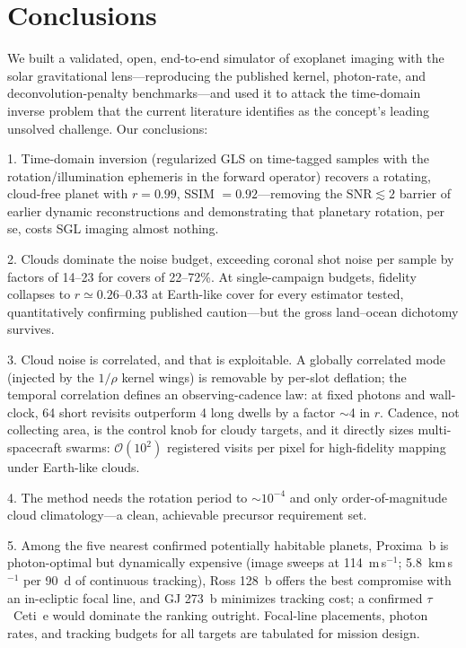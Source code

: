 ﻿\documentclass[twocolumn]{emulateapj}
\begin{document}
\section{Conclusions}
\label{sec:conclusions}

We built a validated, open, end-to-end simulator of exoplanet imaging
with the solar gravitational lens---reproducing the published kernel,
photon-rate, and deconvolution-penalty benchmarks---and used it to
attack the time-domain inverse problem that the current literature
identifies as the concept's leading unsolved challenge. Our conclusions:

1. Time-domain inversion (regularized GLS on time-tagged samples with
the rotation/illumination ephemeris in the forward operator) recovers a
rotating, cloud-free planet with $r=0.99$, SSIM $=0.92$---removing the
$\mathrm{SNR}\lesssim2$ barrier of earlier dynamic reconstructions and
demonstrating that planetary rotation, per se, costs SGL imaging almost
nothing.

2. Clouds dominate the noise budget, exceeding coronal shot noise
per sample by factors of 14--23 for covers of 22--72\%. At
single-campaign budgets, fidelity collapses to $r\simeq0.26$--0.33 at
Earth-like cover for every estimator tested, quantitatively confirming
published caution---but the gross land--ocean dichotomy survives.

3. Cloud noise is correlated, and that is exploitable. A globally
correlated mode (injected by the $1/\rho$ kernel wings) is removable by
per-slot deflation; the temporal correlation defines an
observing-cadence law: at fixed photons and wall-clock, 64 short
revisits outperform 4 long dwells by a factor $\sim$4 in $r$. Cadence,
not collecting area, is the control knob for cloudy targets, and it
directly sizes multi-spacecraft swarms: $\mathcal{O}(10^2)$ registered
visits per pixel for high-fidelity mapping under Earth-like clouds.

4. The method needs the rotation period to $\sim10^{-4}$ and only
order-of-magnitude cloud climatology---a clean, achievable precursor
requirement set.

5. Among the five nearest confirmed potentially habitable planets,
Proxima~b is photon-optimal but dynamically expensive
(image sweeps at 114~m\,s$^{-1}$; 5.8~km\,s$^{-1}$ per 90~d of
continuous tracking), Ross 128~b offers the best compromise with an
in-ecliptic focal line, and GJ 273~b minimizes tracking cost; a
confirmed $\tau$~Ceti~e would dominate the ranking outright. Focal-line
placements, photon rates, and tracking budgets for all targets are
tabulated for mission design.
\end{document}
